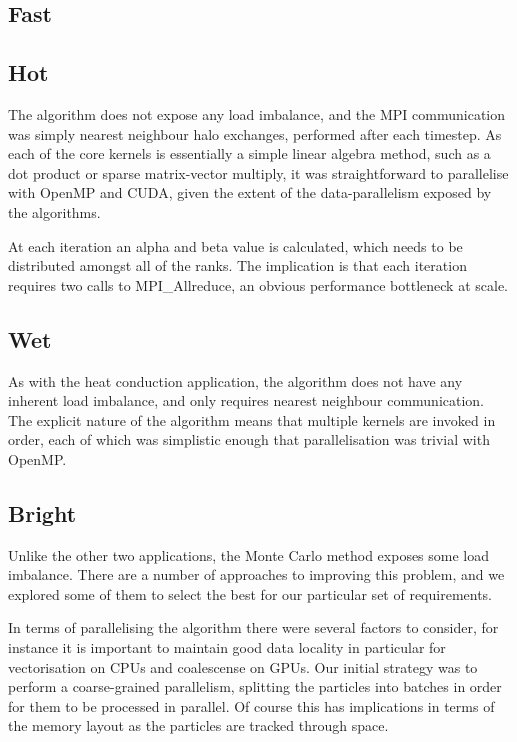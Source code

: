 \documentclass[runningheads,a4paper]{llncs}
\begin{document}
\subsection{Fast}


\subsection{Hot}

The algorithm does not expose any load imbalance, and the MPI communication was simply nearest neighbour halo exchanges, performed after each timestep. As each of the core kernels is essentially a simple linear algebra method, such as a dot product or sparse matrix-vector multiply, it was straightforward to parallelise with OpenMP and CUDA, given the extent of the data-parallelism exposed by the algorithms.

At each iteration an alpha and beta value is calculated, which needs to be distributed amongst all of the ranks. The implication is that each iteration requires two calls to MPI\_Allreduce, an obvious performance bottleneck at scale. 

\subsection{Wet}

As with the heat conduction application, the algorithm does not have any inherent load imbalance, and only requires nearest neighbour communication. The explicit nature of the algorithm means that multiple kernels are invoked in order, each of which was simplistic enough that parallelisation was trivial with OpenMP.

\subsection{Bright}

Unlike the other two applications, the Monte Carlo method exposes some load imbalance. There are a number of approaches to improving this problem, and we explored some of them to select the best for our particular set of requirements. 

In terms of parallelising the algorithm there were several factors to consider, for instance it is important to maintain good data locality in particular for vectorisation on CPUs and coalescense on GPUs. Our initial strategy was to perform a coarse-grained parallelism, splitting the particles into batches in order for them to be processed in parallel. Of course this has implications in terms of the memory layout as the particles are tracked through space.
\end{document}
